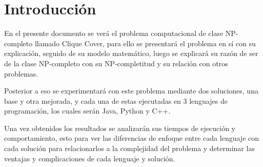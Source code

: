 \section{Introducción}

En el presente documento se verá el problema computacional de clase NP-completo llamado Clique Cover, para ello se presentará el problema en sí con su explicación, seguido de su modelo matemático, luego se explicará su razón de ser de la clase NP-completo con su NP-completitud y su relación con otros problemas.

\vspace{0.5 cm}

Posterior a eso se experimentará con este problema mediante dos soluciones, una base y otra mejorada, y cada una de estas ejecutadas en 3 lenguajes de programación, los cuales serán Java, Python y C++.

\vspace{0.5 cm}

Una vez obtenidos los resultados se analizarán sus tiempos de ejecución y comportamiento, esto para ver las diferencias de enfoque entre cada lenguaje con cada solución para relacionarlos a la complejidad del problema y determinar las ventajas y complicaciones de cada lenguaje y solución.